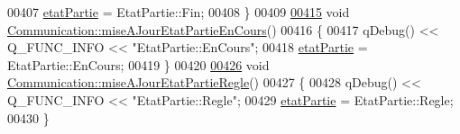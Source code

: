 \begin{DoxyCode}
00407     \hyperlink{class_communication_a2539ded2780db2c732690c585c768c96}{etatPartie} = EtatPartie::Fin;
00408 \}
00409 
\hyperlink{class_communication_a1f90de1ff5f98de887b9c77664e105c7}{00415} \textcolor{keywordtype}{void} \hyperlink{class_communication_a1f90de1ff5f98de887b9c77664e105c7}{Communication::miseAJourEtatPartieEnCours}()
00416 \{
00417     qDebug() << Q\_FUNC\_INFO << \textcolor{stringliteral}{"EtatPartie::EnCours"};
00418     \hyperlink{class_communication_a2539ded2780db2c732690c585c768c96}{etatPartie} = EtatPartie::EnCours;
00419 \}
00420 
\hyperlink{class_communication_a01a86890468a8ecfb900bf15dcab92f2}{00426} \textcolor{keywordtype}{void} \hyperlink{class_communication_a01a86890468a8ecfb900bf15dcab92f2}{Communication::miseAJourEtatPartieRegle}()
00427 \{
00428     qDebug() << Q\_FUNC\_INFO << \textcolor{stringliteral}{"EtatPartie::Regle"};
00429     \hyperlink{class_communication_a2539ded2780db2c732690c585c768c96}{etatPartie} = EtatPartie::Regle;
00430 \}
\end{DoxyCode}
